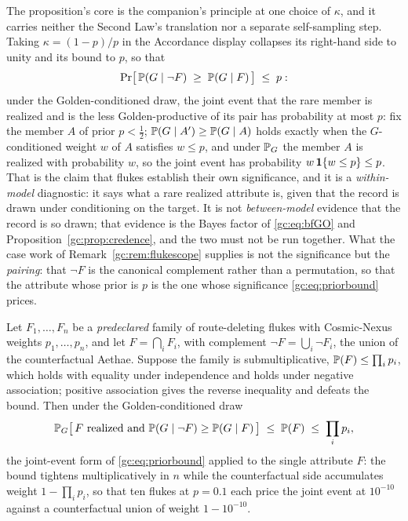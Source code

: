 \noindent The proposition's core is the companion's principle at one
choice of $\kappa$, and it carries neither the Second Law's
translation nor a separate self-sampling step. Taking
$\kappa=(1-p)/p$ in the Accordance display collapses its right-hand
side to unity and its bound to $p$, so that
\begin{equation}\label{gc:eq:priorbound}
\Pr\!\big[\,\mathbb{P}(G\mid\neg F)\;\ge\;\mathbb{P}(G\mid F)\,\big]\;\le\;p:
\end{equation}
under the Golden-conditioned draw, the joint event that the rare member
is realized and is the less Golden-productive of its pair has
probability at most $p$: fix the member $A$ of prior $p<\tfrac12$;
$\mathbb{P}(G\mid A')\ge\mathbb{P}(G\mid A)$ holds exactly when the $G$-conditioned
weight $w$ of $A$ satisfies $w\le p$, and under $\mathbb{P}_G$ the member $A$
is realized with probability $w$, so the joint event has probability
$w\,\mathbf{1}\{w\le p\}\le p$. That is the claim that flukes establish
their own significance, and it is a \emph{within-model} diagnostic: it
says what a rare realized attribute is, given that the record is drawn
under conditioning on the target. It is not \emph{between-model}
evidence that the record is so drawn; that evidence is the Bayes factor
of \eqref{gc:eq:bfGO} and Proposition~\ref{gc:prop:credence}, and the
two must not be run together. What the case work of
Remark~\ref{gc:rem:flukescope} supplies is not the significance but
the \emph{pairing}: that $\neg F$ is the canonical complement rather
than a permutation, so that the attribute whose prior is $p$ is the
one whose significance \eqref{gc:eq:priorbound} prices.

\begin{proposition}\label{gc:prop:stockpile}
Let $F_1,\dots,F_n$ be a \emph{predeclared} family of route-deleting
flukes with Cosmic-Nexus weights $p_1,\dots,p_n$, and let
$F=\bigcap_iF_i$, with complement $\neg F=\bigcup_i\neg F_i$, the union
of the counterfactual Aethae. Suppose the family is submultiplicative,
$\mathbb{P}(F)\le\prod_ip_i$, which holds with equality under independence and
holds under negative association; positive association gives the reverse
inequality and defeats the bound. Then under the Golden-conditioned draw
\begin{equation}\label{gc:eq:stockpile}
\mathbb{P}_G\bigl[\,F\text{ realized and }\mathbb{P}(G\mid\neg F)\ge\mathbb{P}(G\mid F)\,\bigr]
\;\le\;\mathbb{P}(F)\;\le\;\prod_ip_i,
\end{equation}
the joint-event form of \eqref{gc:eq:priorbound} applied to the single
attribute $F$: the bound tightens multiplicatively in $n$ while the
counterfactual side accumulates weight $1-\prod_ip_i$, so that ten
flukes at $p=0.1$ each price the joint event at $10^{-10}$ against a
counterfactual union of weight $1-10^{-10}$.
\end{proposition}

